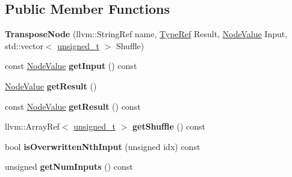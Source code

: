 \subsection*{Public Member Functions}
\begin{DoxyCompactItemize}
\item 
\mbox{\label{classglow_1_1_transpose_node_a5d352fdf31fccb44f96519b4e68c49bf}} 
{\bfseries Transpose\+Node} (llvm\+::\+String\+Ref name, \hyperlink{structglow_1_1_type}{Type\+Ref} Result, \hyperlink{structglow_1_1_node_value}{Node\+Value} Input, std\+::vector$<$ \hyperlink{namespaceglow_a0ca574644e1e42ef193a9947fb4d8911}{unsigned\+\_\+t} $>$ Shuffle)
\item 
\mbox{\label{classglow_1_1_transpose_node_a9a0d2d6afbf92fb073acdc5a9d15cafa}} 
const \hyperlink{structglow_1_1_node_value}{Node\+Value} {\bfseries get\+Input} () const
\item 
\mbox{\label{classglow_1_1_transpose_node_a6008a31f9e77d74f5079434954107fe2}} 
\hyperlink{structglow_1_1_node_value}{Node\+Value} {\bfseries get\+Result} ()
\item 
\mbox{\label{classglow_1_1_transpose_node_aa744caa0dc2802bd573b89358906b3c6}} 
const \hyperlink{structglow_1_1_node_value}{Node\+Value} {\bfseries get\+Result} () const
\item 
\mbox{\label{classglow_1_1_transpose_node_a9fa74473c4b0da372d18a6105218233c}} 
llvm\+::\+Array\+Ref$<$ \hyperlink{namespaceglow_a0ca574644e1e42ef193a9947fb4d8911}{unsigned\+\_\+t} $>$ {\bfseries get\+Shuffle} () const
\item 
\mbox{\label{classglow_1_1_transpose_node_a0dcd48d62e769987e4a452e7c48458e3}} 
bool {\bfseries is\+Overwritten\+Nth\+Input} (unsigned idx) const
\item 
\mbox{\label{classglow_1_1_transpose_node_ae40cdac0caf96bd612f1c2f47eaec401}} 
unsigned {\bfseries get\+Num\+Inputs} () const
\item 
\mbox{\label{classglow_1_1_transpose_node_ae137d6d866d6654650200f44878f7e33}} 

\end{DoxyCompactItemize}
